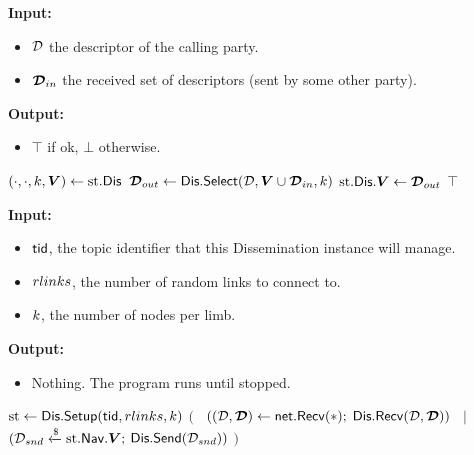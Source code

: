 \begin{algorithm}[H]
\caption{\disrecv}
\label{alg:disrecv}
\textbf{Input:}
\begin{itemize}
\vspace{-.8em}
\itemsep0em 
    \item $\mathcal{D}$ the descriptor of the calling party.
    \item $\boldsymbol{\mathcal{D}}_{in}$ the received set of descriptors (sent by some other party).
\end{itemize}
\textbf{Output:}
\begin{itemize}
\vspace{-.8em}
\itemsep0em 
    \item $\top$ if ok, $\bot$ otherwise.
\end{itemize}
\begin{algorithmic}
    \State $(\cdot,\cdot,k,\boldsymbol{V}) \gets \text{st}.\mathsf{Dis}$
    \State $\boldsymbol{\mathcal{D}}_{out} \gets \mathsf{Dis}.\mathsf{Select}(\mathcal{D},\boldsymbol{V}\cup\boldsymbol{\mathcal{D}}_{in},k)$
    \State $\text{st}.\mathsf{Dis}.\boldsymbol{V} \gets \boldsymbol{\mathcal{D}}_{out}$
    \State \Return $\top$
    \end{algorithmic}
\end{algorithm}

\begin{algorithm}[H]
\caption{\disrun}
\label{alg:disrun}
\textbf{Input:}
\begin{itemize}
\vspace{-.8em}
\itemsep0em 
    \item $\mathsf{tid}$, the topic identifier that this Dissemination instance will manage.
    \item $rlinks$, the number of random links to connect to.
    \item $k$, the number of nodes per limb.
\end{itemize}
\textbf{Output:}
\begin{itemize}
\vspace{-.8em}
\itemsep0em 
    \item Nothing. The program runs until stopped.
\end{itemize}
\begin{algorithmic}
\State $\text{st} \gets \mathsf{Dis}.\mathsf{Setup}(\mathsf{tid},rlinks,k)$
\State {}
\State $($
\State ~$((\mathcal{D},\boldsymbol{\mathcal{D}}) \gets \mathsf{net}.\mathsf{Recv}(\ast);$ $\mathsf{Dis}.\mathsf{Recv}(\mathcal{D}, \boldsymbol{\mathcal{D}}))$
\State ~$|$
%
\State ~$(\mathcal{D}_{snd} \mathrel{\xleftarrow{\$}} \text{st}.\mathsf{Nav}.\boldsymbol{V};$ $\mathsf{Dis}.\mathsf{Send}(\mathcal{D}_{snd}))$
\State $)$
\EndWhile
\end{algorithmic}
\end{algorithm}